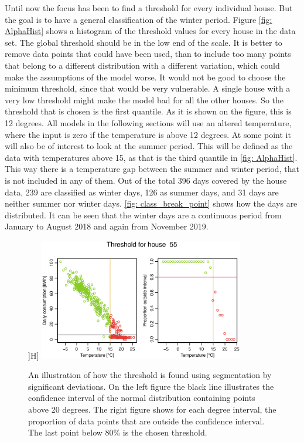 \noindent Until now the focus has been to find a threshold for every individual house. But the goal is to have a general classification of the winter period. Figure \ref{fig: AlphaHist} shows a histogram of the threshold values for every house in the data set. The global threshold should be in the low end of the scale. It is better to remove data points that could have been used, than to include too many points that belong to a different distribution with a different variation, which could make the assumptions of the model worse. It would not be good to choose the minimum threshold, since that would be very vulnerable. A single house with a very low threshold might make the model bad for all the other houses. So the threshold that is chosen is the first quantile. As it is shown on the figure, this is 12 degrees. All models in the following sections will use an altered temperature, where the input is zero if the temperature is above 12 degrees. At some point it will also be of interest to look at the summer period. This will be defined as the data with temperatures above 15, as that is the third quantile in \cref{fig: AlphaHist}. This way there is a temperature gap between the summer and winter period, that is not included in any of them. Out of the total 396 days covered by the house data, 239 are classified as winter days, 126 as summer days, and 31 days are neither summer nor winter days. \cref{fig: class_break_point} shows how the days are distributed. It can be seen that the winter days are a continuous period from January to August 2018 and again from November 2019.
\begin{figure}]H]
    \centering
    \includegraphics[width=0.8\textwidth]{../../../figures/breakpoint_55.eps}
    \caption{An illustration of how the threshold is found using segmentation by significant deviations. On the left figure the black line illustrates the confidence interval of the normal distribution containing points above 20 degrees. The right figure shows for each degree interval, the proportion of data points that are outside the confidence interval. The last point below 80\% is the chosen threshold.}
    \label{fig: break_point55}
\end{figure}

